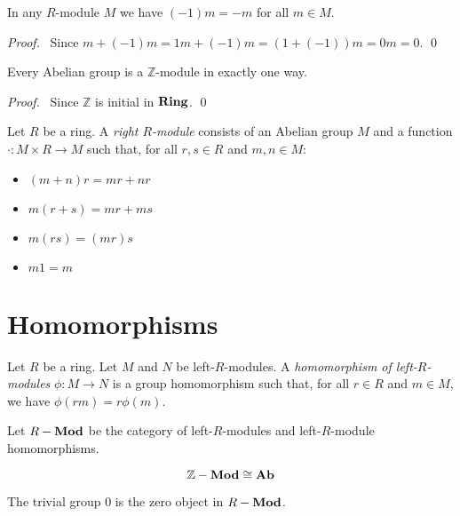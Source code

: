 \begin{prop}
In any $R$-module $M$ we have $(-1)m = -m$ for all $m \in M$.
\end{prop}

\begin{proof}
\pf\ Since $m + (-1)m = 1m + (-1)m = (1+(-1))m = 0m = 0$. \qed
\end{proof}

\begin{prop}
Every Abelian group is a $\mathbb{Z}$-module in exactly one way.
\end{prop}

\begin{proof}
\pf\ Since $\mathbb{Z}$ is initial in $\mathbf{Ring}$. \qed
\end{proof}

\begin{df}
Let $R$ be a ring. A \emph{right $R$-module} consists of an Abelian group $M$ and a function $\cdot : M \times R \rightarrow M$ such that, for all $r,s \in R$ and $m,n \in M$:
\begin{itemize}
\item $(m+n)r = mr + nr$
\item $m(r+s) = mr + ms$
\item $m(rs) = (mr)s$
\item $m1 = m$
\end{itemize}
\end{df}

\section{Homomorphisms}

\begin{df}
Let $R$ be a ring. Let $M$ and $N$ be left-$R$-modules. A \emph{homomorphism of left-$R$-modules} $\phi : M \rightarrow N$ is a group homomorphism such that, for all $r \in R$ and $m \in M$, we have $\phi(rm) = r\phi(m)$.

Let ${R}-\mathbf{Mod}$ be the category of left-$R$-modules and left-$R$-module homomorphisms.
\end{df}

\begin{ex}
\[ {\mathbb{Z}}-\mathbf{Mod} \cong \mathbf{Ab} \]
\end{ex}

\begin{ex}
The trivial group $0$ is the zero object in ${R}-\mathbf{Mod}$.
\end{ex}

